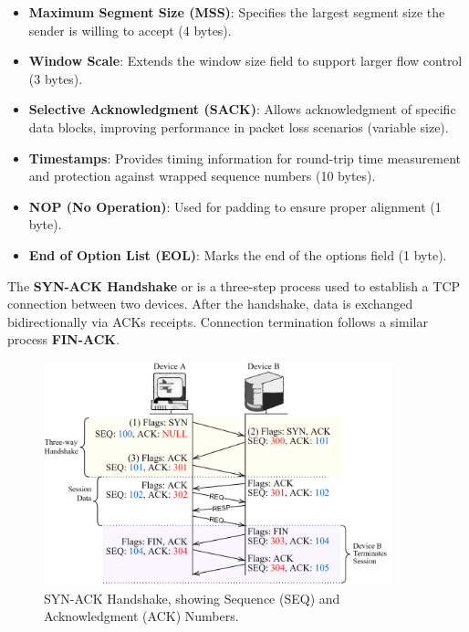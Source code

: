 \newpage
\begin{Def}

    \begin{itemize}
        \item \textbf{Maximum Segment Size (MSS)}: Specifies the largest segment size the sender is willing to accept (4 bytes).
        \item \textbf{Window Scale}: Extends the window size field to support larger flow control (3 bytes).
        \item \textbf{Selective Acknowledgment (SACK)}: Allows acknowledgment of specific data blocks, improving performance in packet loss scenarios (variable size).
        \item \textbf{Timestamps}: Provides timing information for round-trip time measurement and protection against wrapped sequence numbers (10 bytes).
        \item \textbf{NOP (No Operation)}: Used for padding to ensure proper alignment (1 byte).
        \item \textbf{End of Option List (EOL)}: Marks the end of the options field (1 byte). \hfill \cite{rfc793}
    \end{itemize}

\end{Def}

\vspace{-.5em}
\begin{Def}

    The \textbf{SYN-ACK Handshake} or is a three-step process used to establish a TCP connection between two devices.
    After the handshake, data is exchanged bidirectionally via ACKs receipts. Connection termination follows a similar process \textbf{FIN-ACK}.
\end{Def}

\vspace{-1em}
\begin{figure}[h!]
    \hspace{2em}
    \includegraphics[width=0.9\textwidth]{Sections/network/synack.png}
    \caption{SYN-ACK Handshake, showing Sequence (SEQ) and Acknowledgment (ACK) Numbers.}
    \label{fig:tcp_options}
\end{figure}

